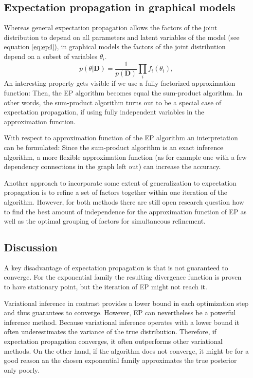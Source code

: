 \documentclass{sigkdd}
\begin{document}
\subsection{Expectation propagation in graphical models}
Whereas general expectation propagation allows the factors of the joint distribution to depend on all parameters and latent variables of the model (see equation \ref{eq:ep4}), in graphical models the factors of the joint distribution depend on a subset of variables $\theta_i$.
\begin{equation}\label{eq:ep9}
p(\theta|\mathbf{D}) = \frac{1}{p(\mathbf{D})} \prod_i f_i(\theta_i),
\end{equation}
An interesting property gets visible if we use a fully factorized approximation function: Then, the EP algorithm becomes equal the sum-product algorithm. In other words, the sum-product algorithm turns out to be a special case of expectation propagation, if using fully independent variables in the approximation function.

With respect to approximation function of the EP algorithm an interpretation can be formulated: Since the sum-product algorithm is an exact inference algorithm, a more flexible approximation function (as for example one with a few dependency connections in the graph left out) can increase the accuracy.

Another approach to incorporate some extent of generalization to expectation propagation is to refine a set of factors together within one iteration of the algorithm. However, for both methods there are still open research question how to find the best amount of independence for the approximation function of EP as well as the optimal grouping of factors for simultaneous refinement.

\subsection{Discussion}
A key disadvantage of expectation propagation is that is not guaranteed to converge. For the exponential family the resulting divergence function is proven to have stationary point, but the iteration of EP might not reach it.

Variational inference in contrast provides a lower bound in each optimization step and thus guarantees to converge. However, EP can nevertheless be a powerful inference method. Because variational inference operates with a lower bound it often underestimates the variance of the true distribution. Therefore, if expectation propagation converges, it often outperforms other variational methods. On the other hand, if the algorithm does not converge, it might be for a good reason an the chosen exponential family approximates the true posterior only poorly.
\end{document}
